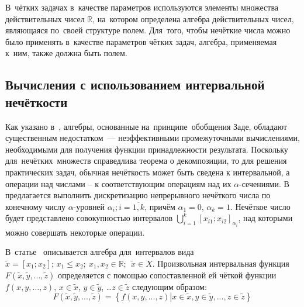 В~чётких задачах в~качестве параметров используются элементы множества действительных чисел $\mathbb{R}$, на~котором определена алгебра действительных чисел, являющаяся по~своей структуре полем. Для~того, чтобы нечёткие числа можно было применять в~качестве параметров чётких задач, алгебра, применяемая к~ним, также должна быть полем.


\subsection{Вычисления с использованием интервальной нечёткости}
Как указано в~\cite{Rotshtein, Borisov_Krumberg_Riga}, алгебры, основанные на~принципе~обобщения Заде, обладают существенным недостатком~--- неэффективными промежуточными вычислениями, необходимыми для получения функции принадлежности результата. Поскольку для~нечётких~множеств справедлива теорема о декомпозиции, то для решения практических задач, обычная нечёткость может быть сведена к интервальной, а операции над числами – к соответствующим операциям над их $\alpha$-сечениями. В~\cite{Borisov_Krumberg_Riga} предлагается выполнить дискретизацию непрерывного нечёткого числа по конечному числу $\alpha$-уровней $\alpha_i;i=\overline{1,k}$, причём $\alpha_1=0$, $\alpha_k=1$. Нечёткое число будет представлено совокупностью интервалов $\displaystyle \bigcup\limits_{i=1}^{k}{{{\left[ x_{i1}; x_{i2} \right]}_{\alpha_i}}}$, над которыми можно совершать некоторые операции.

В~статье~\cite{Levin} описывается алгебра для~интервалов вида $\tilde{x}=\left[ {{x}_{1}};{{x}_{2}} \right];\,{{x}_{1}}\le {{x}_{2}};\ {{x}_{1}},{{x}_{2}}\in \mathbb{R};\ \ \tilde{x}\in X$. Произвольная интервальная функция $F\left( \tilde{x},\tilde{y},...,\tilde{z} \right)$ определяется с помощью сопоставленной ей чёткой функции $f\left( x,y,\ldots,z \right)$, $x\in \tilde{x}$, $y\in \tilde{y}$, …$z\in \tilde{z}$ следующим образом:
\begin{equation}
\label{eq:interval-function}
	F\left( \tilde{x},\tilde{y},...,\tilde{z} \right)=\left\{ f\left( x,y,...,z \right)\left| x\in \tilde{x},y\in \tilde{y},...,z\in \tilde{z} \right. \right\}
\end{equation}

